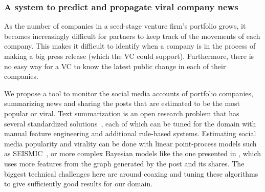 \subsubsection{A system to predict and propagate viral company news}

As the number of companies in a seed-stage venture firm's portfolio grows, it becomes increasingly difficult for partners to keep track of the movements of each company. This makes it difficult to identify when a company is in the process of making a big press release (which the VC could support). Furthermore, there is no easy way for a VC to know the latest public change in each of their companies.

We propose a tool to monitor the social media accounts of portfolio companies, summarizing news and sharing the posts that are estimated to be the most popular or viral. Text summarization is an open research problem that has several standardized solutions~\cite{textsummarization}, each of which can be tuned for the domain with manual feature engineering and additional rule-based systems. Estimating social media popularity and virality can be done with linear point-process models such as SEISMIC~\cite{seismic}, or more complex Bayesian models like the one presented in \cite{bayesiantweets}, which uses more features from the graph generated by the post and its shares. The biggest technical challenges here are around coaxing and tuning these algorithms to give sufficiently good results for our domain.

